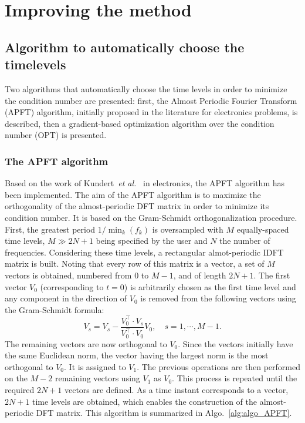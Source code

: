 \chapter{Improving the method} %
\label{cha:improving_the_method}


\section{Algorithm to automatically choose the timelevels} %
\label{sec:algorithm_to_automatically_choose_the_timelevels}

Two algorithms that automatically choose the time levels in order to
minimize the condition number are presented: first, the Almost
Periodic Fourier Transform (APFT) algorithm, initially proposed in the
 literature for electronics problems, is described, then a gradient-based
optimization algorithm over the condition number (OPT) is presented.

\subsection{The APFT algorithm}
\label{sec:apft_algorithm}

Based on the work of Kundert~\emph{et al.}~\cite{Kundert1988} in
electronics, the APFT algorithm has been implemented.  The aim of the
APFT algorithm is to maximize the orthogonality of the almost-periodic
DFT matrix in order to minimize its condition number.  It is based on
the Gram-Schmidt orthogonalization procedure.  First, the greatest
period $1/\min_k(f_k)$ is oversampled with $M$ equally-spaced time
levels, $M\gg2N+1$ being specified by the user and $N$ the number of
frequencies. Considering these time levels, a rectangular
almot-periodic IDFT matrix is built. Noting that every row of this
matrix is a vector, a set of $M$ vectors is obtained, numbered from 0
to $M-1$, and of length $2N+1$. The first vector $V_0$ (corresponding
to $t=0$) is arbitrarily chosen as the first time level and any
component in the direction of $V_0$ is removed from the following
vectors using the Gram-Schmidt formula:
\begin{equation}
   V_s = V_s - \frac{V_0^\top \cdot V_s}{V_0^\top \cdot V_0} V_0, \quad s=1,\cdots,M-1.
   \label{GramSchmidtAlgo}
\end{equation}
The remaining vectors are now orthogonal to $V_0$.  Since the vectors initially have the same Euclidean norm, the vector having the largest
norm is the most orthogonal to $V_0$.  It is assigned to $V_1$. The previous
operations are then performed on the $M-2$ remaining vectors using $V_1$
as $V_0$. This process is repeated until the required $2N+1$ vectors
are defined. As a time instant corresponds to a vector, $2N+1$ time levels are obtained, 
which enables the construction of the almost-periodic
DFT matrix. This algorithm is summarized in
Algo.~\ref{alg:algo_APFT}. %

